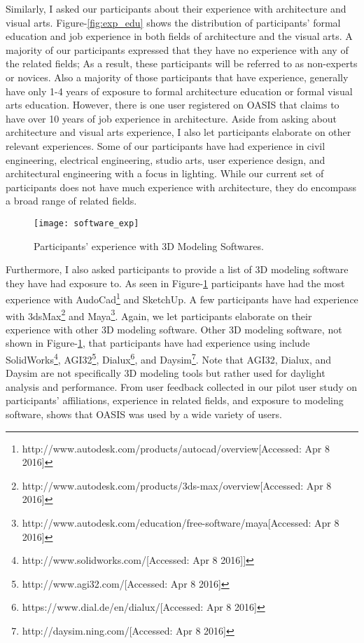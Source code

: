 Similarly, I asked our participants about their experience with architecture and visual arts.  Figure-\ref{fig:exp_edu} shows the distribution of participants' formal education and job experience in both fields of architecture and the visual arts.  A majority of our participants expressed that they have no experience with any of the related fields; As a result, these participants will be referred to as non-experts or novices.  Also a majority of those participants that have experience, generally have only 1-4 years of exposure to formal architecture education or formal visual arts education.  However, there is one user registered on OASIS that claims to have over 10 years of job experience in architecture.  Aside from asking about architecture and visual arts experience, I also let participants elaborate on other relevant experiences.  Some of our participants have had experience in civil engineering, electrical engineering, studio arts, user experience design, and architectural engineering with a focus in lighting.  While our current set of participants does not have much experience with architecture, they do encompass a broad range of related fields.\\

\begin{figure}[!ht]
\centering
\texttt{[image: software\_exp]}
\caption{Participants' experience with 3D Modeling Softwares.}
\label{fig:software_exp}
\end{figure}

Furthermore, I also asked participants to provide a list of 3D modeling software they have had exposure to.  As seen in Figure-\ref{fig:software_exp} participants have had the most experience with AudoCad\footnote{http://www.autodesk.com/products/autocad/overview[Accessed: Apr 8 2016]} and SketchUp.  A few participants have had experience with 3dsMax\footnote{http://www.autodesk.com/products/3ds-max/overview[Accessed: Apr 8 2016]} and Maya\footnote{http://www.autodesk.com/education/free-software/maya[Accessed: Apr 8 2016]}.  Again, we let participants elaborate on their experience with other 3D modeling software.  Other 3D modeling software, not shown in Figure-\ref{fig:software_exp}, that participants have had experience using include SolidWorks\footnote{http://www.solidworks.com/[Accessed: Apr 8 2016]]}, AGI32\footnote{http://www.agi32.com/[Accessed: Apr 8 2016]}, Dialux\footnote{https://www.dial.de/en/dialux/[Accessed: Apr 8 2016]}, and Daysim\footnote{http://daysim.ning.com/[Accessed: Apr 8 2016]}.  Note that AGI32, Dialux, and Daysim are not specifically 3D modeling tools but rather used for daylight analysis and performance.  From user feedback collected in our pilot user study on participants' affiliations, experience in related fields, and exposure to modeling software, shows that OASIS was used by a wide variety of users.  \\

